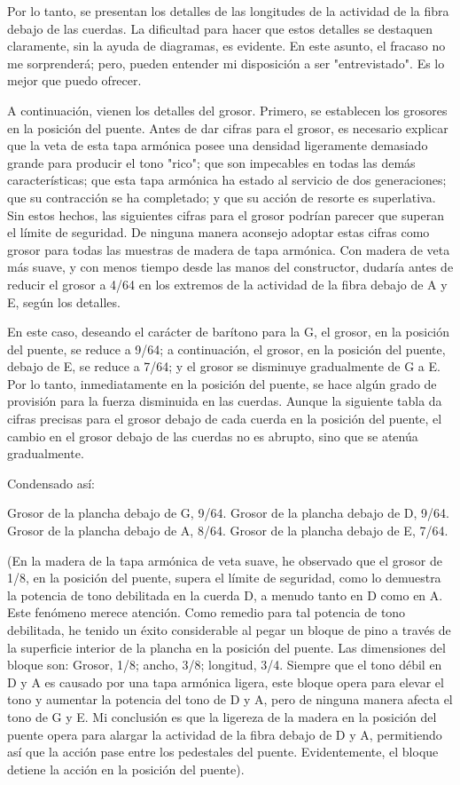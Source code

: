 \documentclass[12pt]{book}
\begin{document}
Por lo tanto, se presentan los detalles de las longitudes de la actividad de la fibra debajo de las cuerdas. La dificultad para hacer que estos detalles se destaquen claramente, sin la ayuda de diagramas, es evidente. En este asunto, el fracaso no me sorprenderá; pero, pueden entender mi disposición a ser "entrevistado". Es lo mejor que puedo ofrecer.

A continuación, vienen los detalles del grosor. Primero, se establecen los grosores en la posición del puente. Antes de dar cifras para el grosor, es necesario explicar que la veta de esta tapa armónica posee una densidad ligeramente demasiado grande para producir el tono "rico"; que son impecables en todas las demás características; que esta tapa armónica ha estado al servicio de dos generaciones; que su contracción se ha completado; y que su acción de resorte es superlativa. Sin estos hechos, las siguientes cifras para el grosor podrían parecer que superan el límite de seguridad. De ninguna manera aconsejo adoptar estas cifras como grosor para todas las muestras de madera de tapa armónica. Con madera de veta más suave, y con menos tiempo desde las manos del constructor, dudaría antes de reducir el grosor a 4/64 en los extremos de la actividad de la fibra debajo de A y E, según los detalles.

En este caso, deseando el carácter de barítono para la G, el grosor, en la posición del puente, se reduce a 9/64; a continuación, el grosor, en la posición del puente, debajo de E, se reduce a 7/64; y el grosor se disminuye gradualmente de G a E. Por lo tanto, inmediatamente en la posición del puente, se hace algún grado de provisión para la fuerza disminuida en las cuerdas. Aunque la siguiente tabla da cifras precisas para el grosor debajo de cada cuerda en la posición del puente, el cambio en el grosor debajo de las cuerdas no es abrupto, sino que se atenúa gradualmente.

Condensado así:

Grosor de la plancha debajo de G, 9/64. Grosor de la plancha debajo de D, 9/64. Grosor de la plancha debajo de A, 8/64. Grosor de la plancha debajo de E, 7/64.

(En la madera de la tapa armónica de veta suave, he observado que el grosor de 1/8, en la posición del puente, supera el límite de seguridad, como lo demuestra la potencia de tono debilitada en la cuerda D, a menudo tanto en D como en A. Este fenómeno merece atención. Como remedio para tal potencia de tono debilitada, he tenido un éxito considerable al pegar un bloque de pino a través de la superficie interior de la plancha en la posición del puente. Las dimensiones del bloque son: Grosor, 1/8; ancho, 3/8; longitud, 3/4. Siempre que el tono débil en D y A es causado por una tapa armónica ligera, este bloque opera para elevar el tono y aumentar la potencia del tono de D y A, pero de ninguna manera afecta el tono de G y E. Mi conclusión es que la ligereza de la madera en la posición del puente opera para alargar la actividad de la fibra debajo de D y A, permitiendo así que la acción pase entre los pedestales del puente. Evidentemente, el bloque detiene la acción en la posición del puente).
\end{document}
